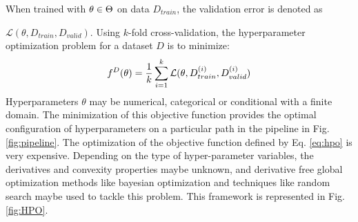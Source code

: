 When trained with $\emph{$\theta$} \in \textbf{$\Theta$}$ on data $D_{train}$, the validation error is denoted as \par
\noindent $\mathcal{L}(\theta, D_{train}, D_{valid})$. Using $k$-fold cross-validation, the hyperparameter optimization problem for a dataset $D$ is to minimize:
\begin{equation}
f^D(\theta) = \frac{1}{k}\sum_{i=1}^{k} \mathcal{L}(\emph{$\theta$}, D_{train}^{(i)}, D_{valid}^{(i)})
\label{eq:hpo}
\end{equation}
Hyperparameters $\theta$ may be numerical, categorical or conditional with a finite domain. The minimization of this objective function provides the optimal configuration of hyperparameters on a particular path in the pipeline in Fig. \ref{fig:pipeline}. The optimization of the objective function defined by Eq. \ref{eq:hpo} is very expensive. Depending on the type of hyper-parameter variables, the derivatives and convexity properties maybe unknown, and derivative free global optimization methods like bayesian optimization and techniques like random search maybe used to tackle this problem. This framework is represented in Fig. \ref{fig:HPO}.


